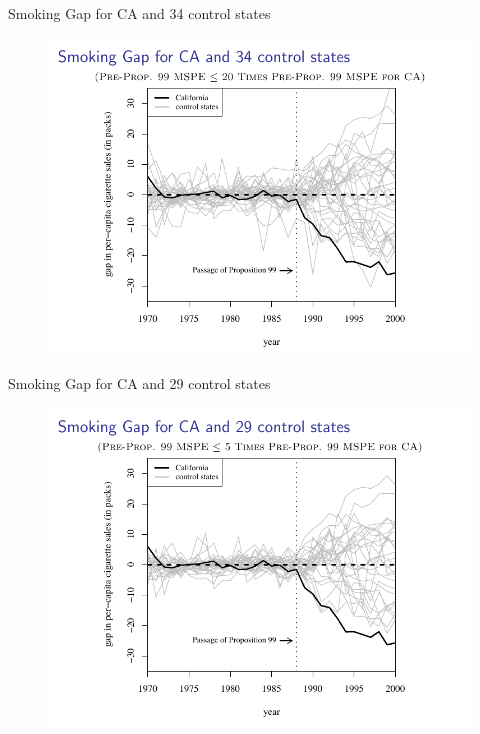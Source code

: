 \documentclass{beamer}
\begin{document}
\begin{frame}{Smoking Gap for CA and 34 control states}
	
	\begin{figure}
	\includegraphics[scale=0.75]{./lecture_includes/abadie_8.pdf}
	\end{figure}
\end{frame}

\begin{frame}{Smoking Gap for CA and 29 control states}
	
	\begin{figure}
	\includegraphics[scale=0.75]{./lecture_includes/abadie_9.pdf}
	\end{figure}
\end{frame}
\end{document}
